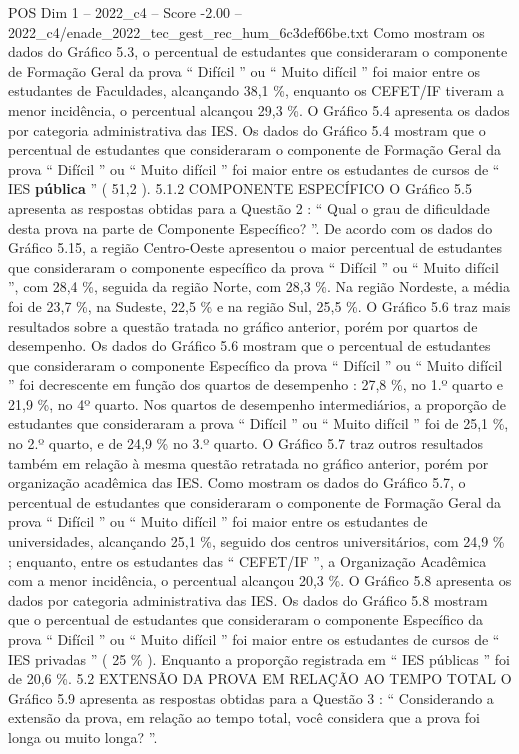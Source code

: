 \begin{textsample}{POS Dim 1 – 2022\_c4 – Score -2.00 – 2022\_c4/enade\_2022\_tec\_gest\_rec\_hum\_6c3def66be.txt}
Como mostram os dados do Gráfico 5.3, o percentual de estudantes que consideraram o componente de Formação Geral da prova “ Difícil ” ou “ Muito difícil ” foi maior entre os estudantes de Faculdades, alcançando 38,1 \%, enquanto os CEFET/IF tiveram a menor incidência, o percentual alcançou 29,3 \%.
O Gráfico 5.4 apresenta os dados por categoria administrativa das IES.
Os dados do Gráfico 5.4 mostram que o percentual de estudantes que consideraram o componente de Formação Geral da prova “ Difícil ” ou “ Muito difícil ” foi maior entre os estudantes de cursos de “ IES \textbf{pública} ” ( 51,2 ). 5.1.2 COMPONENTE ESPECÍFICO O Gráfico 5.5 apresenta as respostas obtidas para a Questão 2 : “ Qual o grau de dificuldade desta prova na parte de Componente Específico? ”.
De acordo com os dados do Gráfico 5.15, a região Centro-Oeste apresentou o maior percentual de estudantes que consideraram o componente específico da prova “ Difícil ” ou “ Muito difícil ”, com 28,4 \%, seguida da região Norte, com 28,3 \%.
Na região Nordeste, a média foi de 23,7 \%, na Sudeste, 22,5 \% e na região Sul, 25,5 \%.
O Gráfico 5.6 traz mais resultados sobre a questão tratada no gráfico anterior, porém por quartos de desempenho.
Os dados do Gráfico 5.6 mostram que o percentual de estudantes que consideraram o componente Específico da prova “ Difícil ” ou “ Muito difícil ” foi decrescente em função dos quartos de desempenho : 27,8 \%, no 1.º quarto e 21,9 \%, no 4º quarto.
Nos quartos de desempenho intermediários, a proporção de estudantes que consideraram a prova “ Difícil ” ou “ Muito difícil ” foi de 25,1 \%, no 2.º quarto, e de 24,9 \% no 3.º quarto.
O Gráfico 5.7 traz outros resultados também em relação à mesma questão retratada no gráfico anterior, porém por organização acadêmica das IES.
Como mostram os dados do Gráfico 5.7, o percentual de estudantes que consideraram o componente de Formação Geral da prova “ Difícil ” ou “ Muito difícil ” foi maior entre os estudantes de universidades, alcançando 25,1 \%, seguido dos centros universitários, com 24,9 \% ; enquanto, entre os estudantes das “ CEFET/IF ”, a Organização Acadêmica com a menor incidência, o percentual alcançou 20,3 \%.
O Gráfico 5.8 apresenta os dados por categoria administrativa das IES.
Os dados do Gráfico 5.8 mostram que o percentual de estudantes que consideraram o componente Específico da prova “ Difícil ” ou “ Muito difícil ” foi maior entre os estudantes de cursos de “ IES privadas ” ( 25 \% ).
Enquanto a proporção registrada em “ IES públicas ” foi de 20,6 \%. 5.2 EXTENSÃO DA PROVA EM RELAÇÃO AO TEMPO TOTAL O Gráfico 5.9 apresenta as respostas obtidas para a Questão 3 : “ Considerando a extensão da prova, em relação ao tempo total, você considera que a prova foi longa ou muito longa? ”.

\end{textsample}

